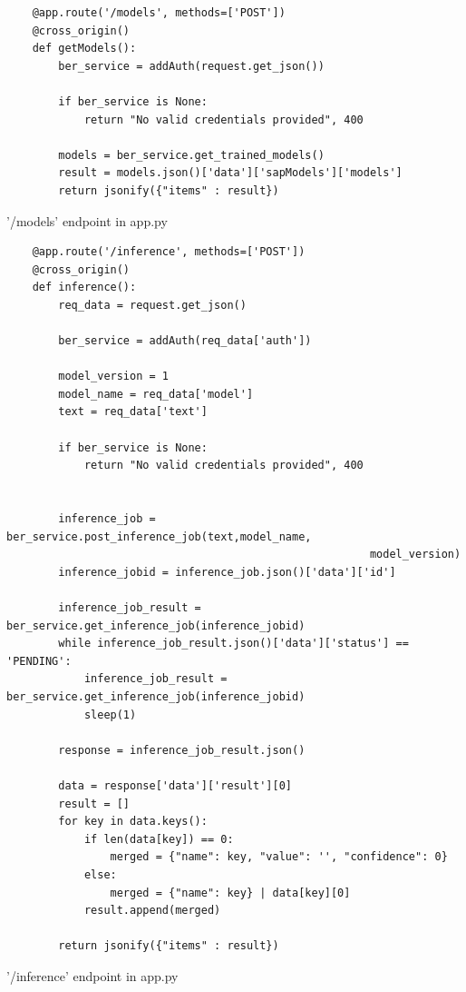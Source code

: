 \begin{listing}[H]
\begin{verbatim}
    @app.route('/models', methods=['POST'])
    @cross_origin()
    def getModels():
        ber_service = addAuth(request.get_json())

        if ber_service is None:
            return "No valid credentials provided", 400
    
        models = ber_service.get_trained_models()
        result = models.json()['data']['sapModels']['models']
        return jsonify({"items" : result})
\end{verbatim}
\caption{'/models' endpoint in app.py}
\end{listing}

\begin {listing}[H]
\begin{verbatim}
    @app.route('/inference', methods=['POST'])
    @cross_origin()
    def inference():
        req_data = request.get_json()

        ber_service = addAuth(req_data['auth'])
        
        model_version = 1
        model_name = req_data['model']
        text = req_data['text']
        
        if ber_service is None:
            return "No valid credentials provided", 400
        

        inference_job = ber_service.post_inference_job(text,model_name, 
                                                        model_version)
        inference_jobid = inference_job.json()['data']['id']
        
        inference_job_result = ber_service.get_inference_job(inference_jobid)
        while inference_job_result.json()['data']['status'] == 'PENDING':
            inference_job_result = ber_service.get_inference_job(inference_jobid)
            sleep(1)

        response = inference_job_result.json()
        
        data = response['data']['result'][0]
        result = []
        for key in data.keys():
            if len(data[key]) == 0:
                merged = {"name": key, "value": '', "confidence": 0}
            else:
                merged = {"name": key} | data[key][0]
            result.append(merged)

        return jsonify({"items" : result})
\end{verbatim}
\caption{'/inference' endpoint in app.py}
\end{listing}

